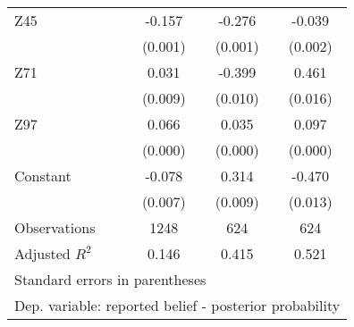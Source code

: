 \begin{table}[htbp]
\begin{tabular}{l*{3}{c}}
Z45             &   -0.157&   -0.276&   -0.039\\
                &  (0.001)&  (0.001)&  (0.002)\\
Z71             &    0.031&   -0.399&    0.461\\
                &  (0.009)&  (0.010)&  (0.016)\\
Z97             &    0.066&    0.035&    0.097\\
                &  (0.000)&  (0.000)&  (0.000)\\
Constant        &   -0.078&    0.314&   -0.470\\
                &  (0.007)&  (0.009)&  (0.013)\\
\hline
Observations    &     1248&      624&      624\\
Adjusted \(R^{2}\)&    0.146&    0.415&    0.521\\
\hline\hline
\multicolumn{4}{l}{\footnotesize Standard errors in parentheses}\\
\multicolumn{4}{l}{\footnotesize Dep. variable: reported belief - posterior probability}\\
\end{tabular}
\end{table}
